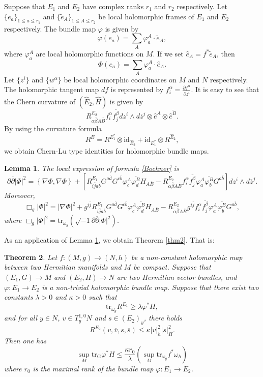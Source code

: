 \documentclass[12pt]{amsart}
\newcommand\bp{{\bar\partial}}
\theoremstyle{plain}
\newtheorem{thm}{Theorem}[section]
\newtheorem{lemma}[thm]{Lemma}
\theoremstyle{definition}
\newcommand{\btheorem}{\begin{thm}}
\newcommand{\etheorem}{\end{thm}}
\newcommand{\elemma}{\end{lemma}}
\newcommand{\blemma}{\begin{lemma}}
\newcommand{\p}{\partial}
\renewcommand{\bar}{\overline}
\renewcommand{\phi}{\varphi}
\newcommand{\beq}{\begin{equation}}
\newcommand{\eeq}{\end{equation}}
\renewcommand{\hat}{\widehat}
\renewcommand{\tilde}{\widetilde}
\renewcommand{\bp}{\bar{\partial}}
\newcommand{\ts}{\otimes}
\renewcommand{\>}{\rightarrow}
\newcommand{\om}{\omega}
\numberwithin{equation}{section} %
\begin{document}
 Suppose that $E_1$ and $E_2$ have complex ranks $r_1$ and $r_2$ respectively.
Let $\{e_a\}_{1\le a\le r_1}$ and $\{\tilde e_A\}_{1\le A\le r_2}$ be local holomorphic frames of $E_1$ and $E_2$ respectively.
The bundle map $\phi$ is given by
\beq
\phi(e_a)=\sum_A \phi_a^A \cdot \tilde e_A,
\eeq
where $\phi_a^A$ are local holomorphic functions on $M$.
If we set $\hat e_A=f^*\tilde e_A$, then
\beq
\Phi(e_a)=\sum_A \phi_a^A \cdot \hat e_A.
\eeq
 Let $\{z^i\}$ and $\{w^\alpha\}$ be local holomorphic coordinates  on $M$ and $N$ respectively. The holomorphic tangent map $df$ is represented by $f_i^\alpha =\frac{\p f^\alpha}{\p z^i}$. It is easy to see that the Chern curvature of $\left(\hat E_2, \hat H\right)$ is given by
\beq  R^{E_2}_{\alpha\bar \beta A\bar B} f_i^\alpha\bar{f_j^\beta} dz^i\wedge d\bar z^j \ts \hat e^A\ts \bar{\hat  e^B}.\eeq
By using the  curvature formula $$R^E=R^{E_1^*}\ts \mathrm{id}_{\hat E_2}+\mathrm{id}_{E_1^*}\ts R^{\hat E_2},$$ we obtain  Chern-Lu type identities  for holomorphic bundle maps.

\blemma\label{bundlechernlu} The local expression of formula \eqref{Bochner} is
\beq
\p\bp |\Phi|^2=\left\{ \nabla \Phi,\nabla\Phi\right\}
+\left[R^{E_1}_{i\bar ja\bar b} G^{a\bar d}G^{c\bar b}\phi_c^A \bar{\phi_d^B} H_{A\bar B }
-R^{E_2}_{\alpha\bar \beta A\bar B} f_i^\alpha\bar{f_j^\beta} \phi_a^A\bar{\phi_b^B} G^{a\bar b}\right]
dz^i\wedge d\bar z^j. \eeq
Moreover, 
\beq \Box_g |\Phi|^2=|\nabla\Phi|^2+g^{i\bar j}R^{E_1}_{i\bar ja\bar b} G^{a\bar d}G^{c\bar b}\phi_c^A \bar{\phi_d^B} H_{A\bar B }
-R^{E_2}_{\alpha\bar \beta A\bar B} g^{i\bar j}f_i^\alpha\bar{f_j^\beta} \phi_a^A\bar{\phi_b^B} G^{a\bar b}, \label{Schwarzbundle}
\eeq
where $\Box_g |\Phi|^2 = \mathrm{tr}_{\omega_g} (\sqrt{-1}\partial \bar{\partial } |\Phi|^2)$.
\elemma

\baselineskip

\noindent As an application of Lemma \ref{bundlechernlu}, we obtain  Theorem \ref{thm2}. That is:

\btheorem\label{thm Schwarz1} Let $f:(M,g)\>(N,h)$ be a non-constant holomorphic map between two Hermitian manifolds and $M$ be compact. Suppose that
$(E_1,G)\>M$ and  $(E_2,H)\>N$  are two Hermitian vector bundles, and $\phi:E_1\to E_2$ is  a non-trivial holomorphic bundle map. Suppose that there exist two constants $\lambda>0$ and $\kappa>0$ such that
\beq
\mathrm{tr}_{\om_g}R^{E_1}\ge \lambda \phi^*H, \label{relativericci}
\eeq
and for all $y\in N$, $v\in T_y^{1,0}N$ and $s\in (E_2)_y$, there holds
\beq
R^{E_2}\left(v,\bar v, s,\bar s\right)\le \kappa|v|_h^2|s|_H^2.\label{Griffiths}
\eeq Then one has
\beq
\sup_M \mathrm{tr_G}\phi^* H \le \frac{\kappa r_0}{\lambda}\left(\sup_M \mathrm{tr}_{\omega_g} f^*\omega_h\right)
\eeq
where $r_0$ is the maximal rank of the bundle map $\phi: E_1\>E_2$.
\etheorem
\end{document}
